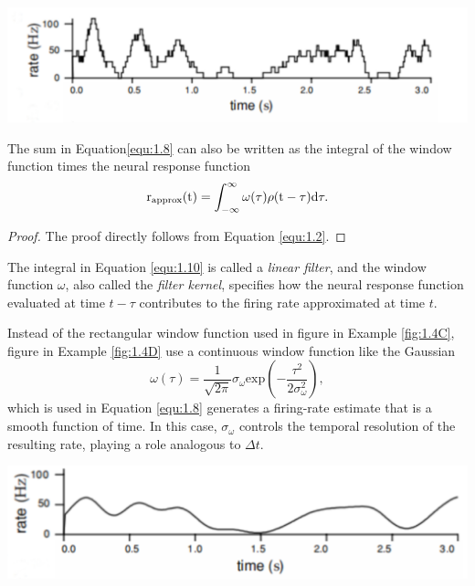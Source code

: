 \begin{center}
  \includegraphics[scale=0.054]{./png/fig_1_4C.png}
\end{center}

\begin{prop}
  The sum in Equation\ref{equ:1.8} can also be written as the integral of the window
function times the neural response function
\begin{equation}
  \label{equ:1.10}
  \rm{r}_{\text{approx}}(t)=\int_{-\infty}^{\infty}\omega(\tau)\rho(t-\tau)d\tau.
\end{equation}
\begin{proof}
  The proof directly follows from Equation \ref{equ:1.2}.
\end{proof}
\end{prop}

\begin{defn}
  The integral in Equation \ref{equ:1.10} is called a \emph{linear filter}, and the window 
  function $\omega$, also called the \emph{filter kernel}, specifies how the neural 
  response function evaluated at time $t-\tau$ contributes to the firing rate approximated 
  at time $t$.
\end{defn}

\begin{exm}
  \label{fig:1.4D}
  Instead of the rectangular window function used in figure in Example \ref{fig:1.4C}, 
  figure in Example \ref{fig:1.4D} use a 
  continuous window function like the Gaussian
  \begin{equation}
    \label{equ:1.11}
    \omega(\tau)=\frac{1}{\sqrt{2\pi}}\sigma_{\omega}\text{exp}\left(-\frac{\tau^2}{2\sigma_{\omega}^2} \right),  
  \end{equation}
   which is used in Equation \ref{equ:1.8} generates 
a firing-rate estimate that is a smooth function of time.
In this case, $\sigma_{\omega}$  controls the temporal resolution of the resulting rate, 
playing a role analogous to $\Delta t$.
\end{exm}

\begin{center}
  \includegraphics[scale=0.245]{./png/fig_1_4D.png}
\end{center}

